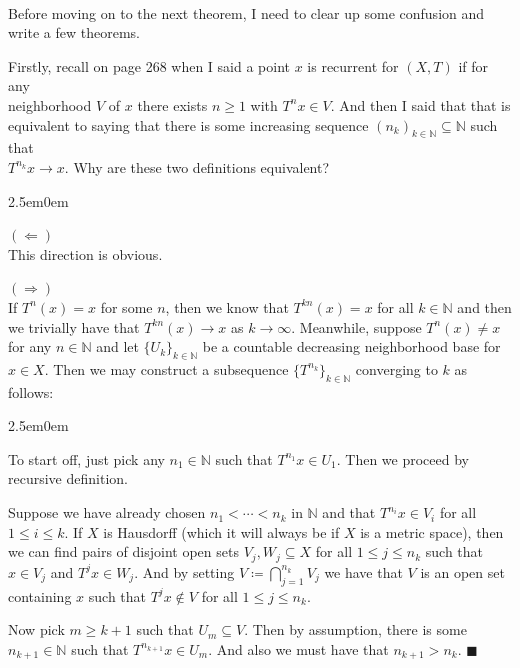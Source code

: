 \documentclass{book}
\newcommand{\pracOne}{
   \color{BrickRed}%
   \fontsize{13}{15}\selectfont%
}
\newcommand{\pracTwo}{
   \color{Orange}%
   \fontsize{12}{14}\selectfont%
}
\newenvironment{myIndent}{%
   \begin{adjustwidth}{2.5em}{0em}%
}{%
   \end{adjustwidth}%
}
\newcommand{\mySepTwo}[1][.]{%
   {\noindent\color{#1}{\rule{6.5in}{0.5mm}}}\\%
}
\newcommand{\retTwo}{\hfill\bigbreak}
\begin{document}
\pracOne\mySepTwo
Before moving on to the next theorem, I need to clear up some confusion and write a few theorems.\retTwo

Firstly, recall on \hypertarget{Furstenberg confusion 1}{page 268} when I said a point $x$ is recurrent for $(X, T)$ if for any\\ neighborhood $V$ of $x$ there exists $n \geq 1$ with $T^n x \in V$. And then I said that that is\\ equivalent to saying that there is some increasing sequence $(n_k)_{k \in \mathbb{N}} \subseteq \mathbb{N}$ such that\\ $T^{n_k}x \to x$. Why are these two definitions equivalent?

\begin{myIndent}\pracTwo
	$(\Longleftarrow)$\\
	This direction is obvious.\retTwo

	$(\Longrightarrow)$\\
	If $T^n(x) = x$ for some $n$, then we know that $T^{kn}(x) = x$ for all $k \in \mathbb{N}$ and then we trivially have that $T^{kn}(x) \to x$ as $k \to \infty$. Meanwhile, suppose $T^n(x) \neq x$ for any $n \in \mathbb{N}$ and let $\{U_k\}_{k \in \mathbb{N}}$ be a countable decreasing neighborhood base for $x \in X$. Then we may construct a subsequence $\{T^{n_k}\}_{k \in \mathbb{N}}$ converging to $k$ as follows:
	\begin{myIndent}
		To start off, just pick any $n_1 \in \mathbb{N}$ such that $T^{n_1}x \in U_1$. Then we proceed by recursive definition.\retTwo
		
		Suppose we have already chosen $n_1 < \cdots < n_k$ in $\mathbb{N}$ and that $T^{n_i}x \in V_{i}$ for all\\ $1 \leq i \leq k$.  If $X$ is Hausdorff (which it will always be if $X$ is a metric space), then we can find pairs of disjoint open sets $V_{j}, W_j \subseteq X$ for all $1 \leq j \leq n_{k}$ such that $x \in V_j$ and $T^{j}x \in W_j$. And by setting $V \coloneqq \bigcap_{j=1}^{n_k} V_j$ we have that $V$ is an open set containing $x$ such that $T^j x \notin V$ for all $1 \leq j \leq n_k$.\retTwo

		Now pick $m \geq k + 1$ such that $U_m \subseteq V$. Then by assumption, there is some $n_{k+1} \in \mathbb{N}$ such that $T^{n_{k+1}} x \in U_m$. And also we must have that $n_{k+1} > n_k$. $\blacksquare$\retTwo
	\end{myIndent}
\end{myIndent}
\end{document}
